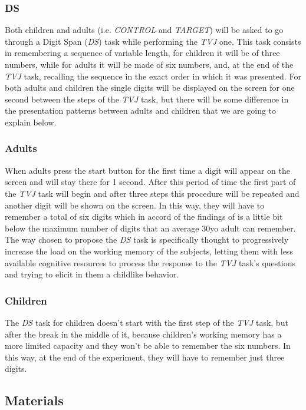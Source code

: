 \documentclass[10pt, a4]{article}
\begin{document}
\subsubsection{DS}
Both children and adults (i.e. \textit{CONTROL} and \textit{TARGET}) will be asked to go through a Digit Span (\textit{DS}) task
while performing the \textit{TVJ} one. This task consists in remembering a sequence of variable length, for children it will be of three numbers,
while for adults it will be made of six numbers, and, at the end of the \textit{TVJ} task, recalling the sequence in the exact order
in which it was presented. For both adults and children the single digits will be displayed on the screen for one second between the steps of the
\textit{TVJ} task, but there will be some difference in the presentation patterns between adults and children that we are going to explain below.

\subsubsection{Adults}
When adults press the start button for the first time a digit will appear on the screen and will stay there for 1 second. After this period of time the first part of the \textit{TVJ}
task will begin and after three steps this procedure will be repeated and another digit will be shown on the screen.
In this way, they will have to remember a total of six digits which in accord of the findings of \cite{taub1972comparison}
is a little bit below the maximum number of digits that an average 30yo adult can remember. The way chosen to propose the \textit{DS} task is specifically
thought to progressively increase the load on the working memory of the subjects, letting them with less available cognitive resources
to process the response to the \textit{TVJ} task's questions and trying to elicit in them a childlike behavior.

\subsubsection{Children}
The \textit{DS} task for children doesn't start with the first step of the \textit{TVJ} task, but after the break in the middle of it,
because children's working memory has a more limited capacity and they won't be able to remember the six numbers.
In this way, at the end of the experiment, they will have to remember just three digits.\\


\subsection{Materials}
\end{document}
